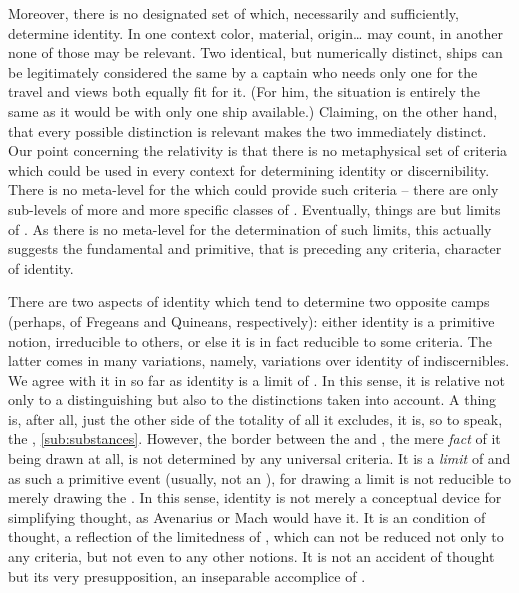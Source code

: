 Moreover, there is no designated set of  which, necessarily and
sufficiently, determine identity. In one context color, material, origin\ldots
may count, in another none of those may be relevant.  Two identical, but
numerically distinct, ships can be legitimately considered the same by a captain
who needs only one for the travel and views both equally fit for it.  (For him,
the situation is entirely the same as it would be with only one ship available.)
Claiming, on the other hand, that every possible distinction is relevant makes
the two immediately distinct. Our point concerning the relativity is that there
is no metaphysical set of criteria which could be used in every context for
determining identity or discernibility.  There is no meta-level for the
 which could provide such criteria -- there are only sub-levels
of more and more specific classes of .  Eventually, 
things are but limits of . As there is no meta-level for the
determination of such limits, this actually suggests the fundamental and
primitive, that is preceding any criteria, character of identity.

There are two aspects of identity which tend to determine two opposite camps
(perhaps, of Fregeans and Quineans, respectively): either identity is a
primitive notion, irreducible to others, or else it is in fact reducible to some
criteria. The latter comes in many variations, namely, variations over identity
of indiscernibles. We agree with it in so far as identity is a limit of
. In this sense, it is relative not only to a distinguishing
 but also to the distinctions taken into account. A thing is,
after all, just the other side of the totality of all it excludes, it is, so to
speak, the , \ref{sub:substances}. However, the
border between the  and , the mere {\em fact} of it
being drawn at all, is not determined by any universal criteria. It is a {\em
  limit} of  and as such a primitive event (usually, not an
), for drawing a limit is not reducible to merely drawing the
. In this sense, identity is not merely a conceptual device for
simplifying thought, as Avenarius or Mach would have it. It is an 
condition of thought, a reflection of the limitedness of , which
can not be reduced not only to any  criteria, but not even to any
other notions. It is not an accident of  thought but its very
presupposition, an inseparable accomplice of .


